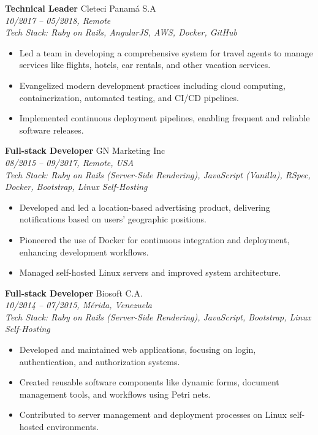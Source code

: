 \documentclass[a4paper,10pt]{article}
\begin{document}
\textbf{Technical Leader} \hfill Cleteci Panamá S.A \\
\textit{10/2017 -- 05/2018, Remote} \\
\textit{Tech Stack: Ruby on Rails, AngularJS, AWS, Docker, GitHub} \\
\begin{itemize}[leftmargin=0.5cm]
    \item Led a team in developing a comprehensive system for travel agents to manage services like flights, hotels, car rentals, and other vacation services.
    \item Evangelized modern development practices including cloud computing, containerization, automated testing, and CI/CD pipelines.
    \item Implemented continuous deployment pipelines, enabling frequent and reliable software releases.
\end{itemize}

\textbf{Full-stack Developer} \hfill GN Marketing Inc \\
\textit{08/2015 -- 09/2017, Remote, USA} \\
\textit{Tech Stack: Ruby on Rails (Server-Side Rendering), JavaScript (Vanilla), RSpec, Docker, Bootstrap, Linux Self-Hosting} \\
\begin{itemize}[leftmargin=0.5cm]
    \item Developed and led a location-based advertising product, delivering notifications based on users' geographic positions.
    \item Pioneered the use of Docker for continuous integration and deployment, enhancing development workflows.
    \item Managed self-hosted Linux servers and improved system architecture.
\end{itemize}

\textbf{Full-stack Developer} \hfill Biosoft C.A. \\
\textit{10/2014 -- 07/2015, Mérida, Venezuela} \\
\textit{Tech Stack: Ruby on Rails (Server-Side Rendering), JavaScript, Bootstrap, Linux Self-Hosting} \\
\begin{itemize}[leftmargin=0.5cm]
    \item Developed and maintained web applications, focusing on login, authentication, and authorization systems.
    \item Created reusable software components like dynamic forms, document management tools, and workflows using Petri nets.
    \item Contributed to server management and deployment processes on Linux self-hosted environments.
\end{itemize}
\end{document}
